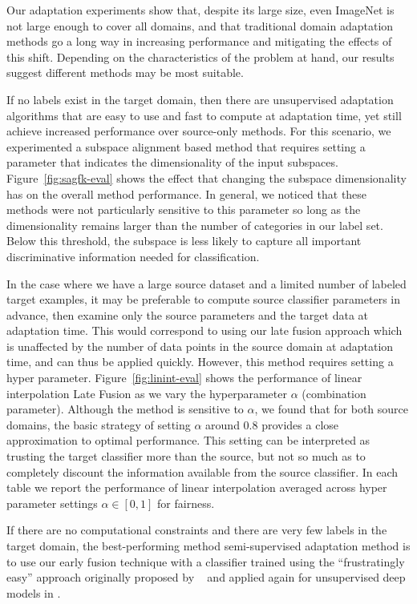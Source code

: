 Our adaptation experiments show that, despite its large size, even ImageNet is not large enough to cover all domains, and
that traditional domain adaptation methods go a long way in increasing performance and mitigating the effects of this shift.
Depending on the characteristics of the problem at hand, our results suggest different methods may be most suitable.

If no labels exist in the target domain, then there are unsupervised adaptation algorithms that are easy to use and fast to compute at adaptation time, yet still achieve increased performance over source-only methods. 
For this scenario, we experimented a subspace alignment based method that requires setting a parameter that indicates the dimensionality of the input subspaces. 
Figure~\ref{fig:sagfk-eval} shows the effect that changing the subspace dimensionality has on the overall method performance. 
In general, we noticed that these methods were not particularly sensitive to this parameter so long as the dimensionality remains larger than the number of categories in our label set.
Below this threshold, the subspace is less likely to capture all important discriminative information needed for classification.

In the case where we have a large source dataset and a limited number of labeled target examples, it may be preferable to compute source classifier parameters in advance, then examine only the source parameters and the target data at adaptation time.
This would correspond to using our late fusion approach which is unaffected by the number of data points in the source domain at adaptation time, and can thus be applied quickly.
However, this method requires setting a hyper parameter. 
Figure~\ref{fig:linint-eval} shows the performance of linear interpolation Late Fusion as we vary the hyperparameter $\alpha$ (combination parameter).
Although the method is sensitive to $\alpha$, we found that for both source domains, the basic strategy of setting $\alpha$ around $0.8$ provides a close approximation to optimal performance. 
This setting can be interpreted as trusting the target classifier more than the source, but not so much as to completely discount the information available from the source classifier. In each table we report the performance of linear interpolation averaged across hyper parameter settings $\alpha \in [0,1]$ for fairness.

If there are no computational constraints and there are very few labels in
the target domain, the best-performing method semi-supervised adaptation method is to use our early fusion technique with a classifier trained using the ``frustratingly easy'' approach originally proposed by \daume~\cite{daume} and applied again for
unsupervised deep models in \cite{ref:dlid}.

